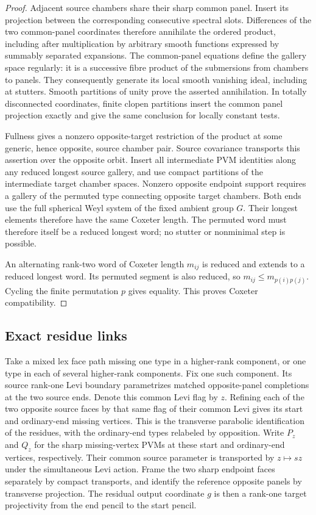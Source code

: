 \begin{proof}
Adjacent source chambers share their sharp common panel. Insert its
projection between the corresponding consecutive spectral slots.
Differences of the two common-panel coordinates therefore annihilate
the ordered product, including after multiplication by arbitrary
smooth functions expressed by summably separated expansions. The
common-panel equations define the gallery space regularly: it is a
successive fibre product of the submersions from chambers to panels.
They consequently generate its local smooth vanishing ideal, including
at stutters. Smooth partitions of unity prove the asserted
annihilation. In totally disconnected coordinates, finite clopen
partitions insert the common panel projection exactly and give the
same conclusion for locally constant tests.

Fullness gives a nonzero opposite-target restriction of the product
at some generic, hence opposite, source chamber pair. Source covariance
transports this assertion over the opposite orbit. Insert all
intermediate PVM identities along any reduced longest source gallery,
and use compact partitions of the intermediate target chamber spaces.
Nonzero opposite endpoint support requires a gallery of the permuted
type connecting opposite target chambers. Both ends use the full
spherical Weyl system of the fixed ambient group $G$. Their longest
elements therefore have the same Coxeter length. The permuted word must
therefore itself be a reduced
longest word; no stutter or nonminimal step is possible.

An alternating rank-two word of Coxeter length $m_{ij}$ is reduced
and extends to a reduced longest word. Its permuted segment is also
reduced, so $m_{ij}\leq m_{p(i)p(j)}$. Cycling the finite permutation
$p$ gives equality. This proves Coxeter compatibility.
\end{proof}

\subsection{Exact residue links}

Take a mixed lex face path missing one type in a higher-rank
component, or one type in each of several higher-rank components.
Fix one such component. Its source rank-one Levi boundary parametrizes
matched opposite-panel completions at the two source ends. Denote
this common Levi flag by $z$. Refining each of the two opposite
source faces by that same flag of their common Levi gives its
start and ordinary-end missing vertices. This is the transverse
parabolic identification of the residues, with the ordinary-end
types relabeled by opposition. Write $P_z$ and $Q_z$ for the sharp
missing-vertex PVMs at these start and ordinary-end vertices,
respectively. Their common source parameter is transported by
$z\mapsto sz$ under the simultaneous Levi action. Frame the two sharp endpoint
faces separately by compact transports, and identify the reference
opposite panels by transverse projection. The residual output
coordinate $g$ is then a rank-one target projectivity from the end
pencil to the start pencil.

